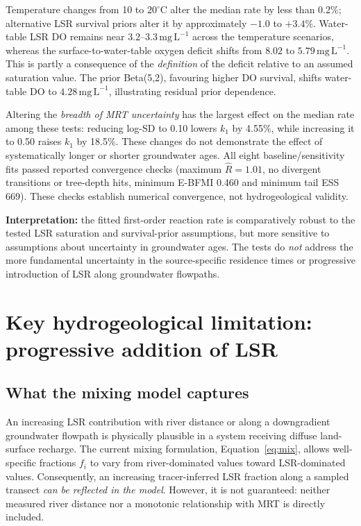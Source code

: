 \documentclass[11pt,a4paper]{article}
\newcommand{\mgL}{\mathrm{mg\,L^{-1}}}
\begin{document}
Temperature changes from 10 to $20^\circ$C alter the median rate by less than 0.2\%; alternative LSR survival priors alter it by approximately $-1.0$ to $+3.4$\%. Water-table LSR DO remains near $3.2$--$3.3\,\mgL$ across the temperature scenarios, whereas the surface-to-water-table oxygen deficit shifts from $8.02$ to $5.79\,\mgL$. This is partly a consequence of the \emph{definition} of the deficit relative to an assumed saturation value. The prior Beta(5,2), favouring higher DO survival, shifts water-table DO to $4.28\,\mgL$, illustrating residual prior dependence.

Altering the \emph{breadth of MRT uncertainty} has the largest effect on the median rate among these tests: reducing log-SD to 0.10 lowers $k_1$ by 4.55\%, while increasing it to 0.50 raises $k_1$ by 18.5\%. These changes do not demonstrate the effect of systematically longer or shorter groundwater ages. All eight baseline/sensitivity fits passed reported convergence checks (maximum $\widehat R=1.01$, no divergent transitions or tree-depth hits, minimum E-BFMI 0.460 and minimum tail ESS 669). These checks establish numerical convergence, not hydrogeological validity.

\textbf{Interpretation:} the fitted first-order reaction rate is comparatively robust to the tested LSR saturation and survival-prior assumptions, but more sensitive to assumptions about uncertainty in groundwater ages. The tests do \emph{not} address the more fundamental uncertainty in the source-specific residence times or progressive introduction of LSR along groundwater flowpaths.

\FloatBarrier
\section{Key hydrogeological limitation: progressive addition of LSR}
\label{sec:flowpath}
\subsection{What the mixing model captures}
An increasing LSR contribution with river distance or along a downgradient groundwater flowpath is physically plausible in a system receiving diffuse land-surface recharge. The current mixing formulation, Equation~\eqref{eq:mix}, allows well-specific fractions \(f_i\) to vary from river-dominated values toward LSR-dominated values. Consequently, an increasing tracer-inferred LSR fraction along a sampled transect \emph{can be reflected in the model}. However, it is not guaranteed: neither measured river distance nor a monotonic relationship with MRT is directly included.
\end{document}
